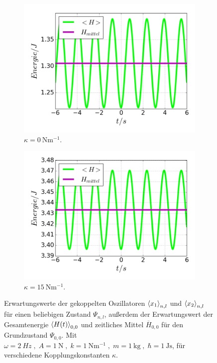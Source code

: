 \begin{figure}
\begin{subfigure}[t]{0.5\textwidth}
      \end{subfigure}
      \begin{subfigure}[t]{0.5\textwidth}
        \centering
        \includegraphics[width=\textwidth]{plots/<H>00_kappa0.png}
        \caption{$\kappa=\SI{0}{\newton \meter^{-1}}$.}
        \label{fig:H_kappa0}
      \end{subfigure}
      \begin{subfigure}[t]{0.5\textwidth}
          \centering
          \includegraphics[width=\textwidth]{plots/<H>00_kappa15.png}
          \caption{$\kappa=\SI{15}{\newton \meter^{-1}}$.}
          \label{fig:H_kappa15}
      \end{subfigure}
      \caption{Erwartungswerte der gekoppelten Oszillatoren $\braket{x_1}_{n,l}$ und $\braket{x_2}_{n,l}$ für einen beliebigen Zustand $\Psi_{n,l}$, außerdem der Erwartungswert der Gesamtenergie $\braket{H(t)}_{0,0}$ und zeitliches Mittel $\overline{H}_{0,0}$ für den Grundzustand $\Psi_{0,0}$. Mit $\omega=\SI{2}{Hz}\;,\; A=\SI{1}{\newton} \;,\; k=\SI{1}{\newton\meter^{-1}} \;,\; m=\SI{1}{\kilo \gram} \;,\; \hbar=\SI{1}{\joule \second}$, für verschiedene Kopplungskonstanten $\kappa$.}
      \label{ferg}
    \end{figure}
